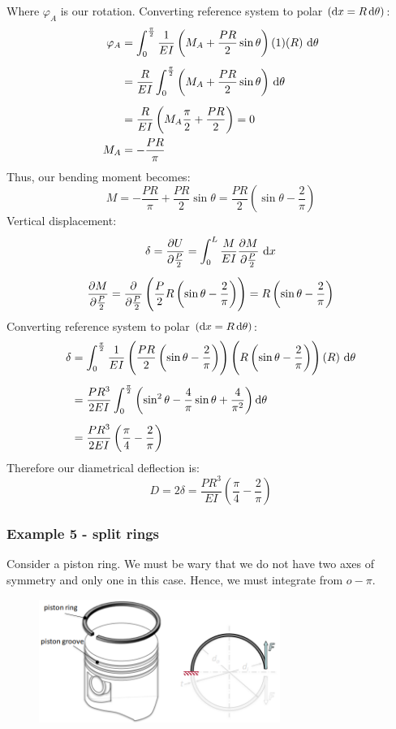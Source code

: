 \documentclass[class=report, crop=false, 12pt,a4paper]{standalone}
\begin{document}
Where $\varphi_A$ is our rotation. Converting reference system to polar $\left(\dif x = R \dif \theta\right)$:
\begin{align}
  \varphi_A &= \int_0^{\frac{\pi}{2}} \frac{1}{EI} \left(M_A + \frac{PR}{2}\sin\theta\right)(1)(R)\, \dif \theta\\[5pt]
  &= \frac{R}{EI} \int_0^{\frac{\pi}{2}} \left(M_A + \frac{PR}{2}\sin\theta\right)\, \dif \theta\\[5pt]
  &= \frac{R}{EI} \left(M_A\frac{\pi}{2} + \frac{PR}{2}\right) = 0\\
  M_A &= -\frac{PR}{\pi}
\end{align}
Thus, our bending moment becomes:
\begin{equation}
  M = -\frac{PR}{\pi} + \frac{PR}{2}\sin\theta = \frac{PR}{2}\left(\sin\theta-\frac{2}{\pi}\right)
\end{equation}
Vertical displacement:
\begin{gather}
  \delta = \frac{\partial U}{\partial \frac{P}{2}} = \int_0^L \frac{M}{EI} \frac{\partial M}{\partial \frac{P}{2}}\, \dif x\\[5pt]
  \frac{\partial M}{\partial \frac{P}{2}} = \frac{\partial}{\partial \frac{P}{2}} \left(\frac{P}{2}R\left(\sin\theta-\frac{2}{\pi}\right)\right) = R\left(\sin\theta - \frac{2}{\pi}\right) 
\end{gather}
Converting reference system to polar $\left(\dif x = R \dif \theta\right)$:
\begin{align}
  \delta &= \int_0^{\frac{\pi}{2}} \frac{1}{EI} \left(\frac{PR}{2}\left(\sin\theta - \frac{2}{\pi}\right)\right) \left(R\left(\sin\theta-\frac{2}{\pi}\right)\right) \left(R\right)\, \dif \theta\\[5pt]
  &= \frac{PR^3}{2EI} \int_0^{\frac{\pi}{2}} \left(\sin^2\theta - \frac{4}{\pi}\sin\theta + \frac{4}{\pi^2}\right)\dif \theta\\[5pt]
  &= \frac{PR^3}{2EI}\left(\frac{\pi}{4}-\frac{2}{\pi}\right)
\end{align}
Therefore our diametrical deflection is:
\begin{equation}
  D = 2\delta = \frac{PR^3}{EI}\left(\frac{\pi}{4}-\frac{2}{\pi}\right)
\end{equation}
\subsubsection{Example 5 - split rings}
Consider a piston ring. We must be wary that we do not have two axes of symmetry and only one in this case. Hence, we must integrate from $o-\pi$. 
\begin{figure}[H]
  \centering
  \includegraphics[width = 0.7\textwidth]{../img/diagram20.png}
  \caption{}
\end{figure}
\end{document}
